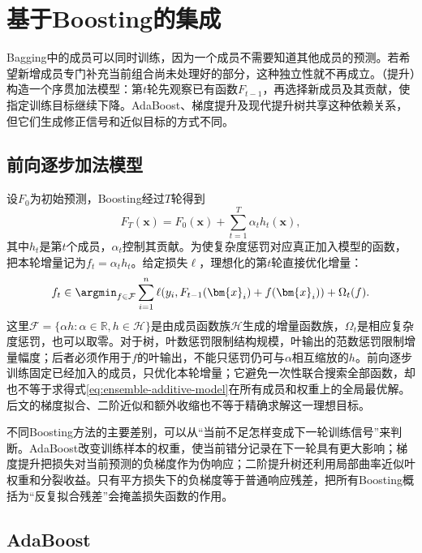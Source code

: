 \section{基于Boosting的集成}
\label{sec:ensemble-boosting}

Bagging中的成员可以同时训练，因为一个成员不需要知道其他成员的预测。若希望新增成员专门补充当前组合尚未处理好的部分，这种独立性就不再成立。（提升）构造一个序贯加法模型：第$t$轮先观察已有函数$F_{t-1}$，再选择新成员及其贡献，使指定训练目标继续下降。AdaBoost、梯度提升及现代提升树共享这种依赖关系，但它们生成修正信号和近似目标的方式不同。

\subsection{前向逐步加法模型}
\label{sec:ensemble-stagewise-additive}

设$F_0$为初始预测，Boosting经过$T$轮得到
\begin{equation}
  F_T(\bm{x})
  =
  F_0(\bm{x})
  +
  \sum_{t=1}^{T}\alpha_t h_t(\bm{x}),
  \label{eq:ensemble-additive-model}
\end{equation}
其中$h_t$是第$t$个成员，$\alpha_t$控制其贡献。为使复杂度惩罚对应真正加入模型的函数，把本轮增量记为$f_t=\alpha_t h_t$。给定损失$\ell$，理想化的第$t$轮直接优化增量：
\begin{equation}
  f_t
  \in
  \argmin_{f\in\mathcal{F}}
  \sum_{i=1}^{n}
  \ell\!\left(
    y_i,
    F_{t-1}(\bm{x}_i)+f(\bm{x}_i)
  \right)
  +\Omega_t(f).
  \label{eq:ensemble-forward-stagewise}
\end{equation}
这里$\mathcal{F}=\{\alpha h:\alpha\in\mathbb{R},h\in\mathcal{H}\}$是由成员函数族$\mathcal{H}$生成的增量函数族，$\Omega_t$是相应复杂度惩罚，也可以取零。对于树，叶数惩罚限制结构规模，叶输出的范数惩罚限制增量幅度；后者必须作用于$f$的叶输出，不能只惩罚仍可与$\alpha$相互缩放的$h$。前向逐步训练固定已经加入的成员，只优化本轮增量；它避免一次性联合搜索全部函数，却也不等于求得式\eqref{eq:ensemble-additive-model}在所有成员和权重上的全局最优解。后文的梯度拟合、二阶近似和额外收缩也不等于精确求解这一理想目标。

不同Boosting方法的主要差别，可以从“当前不足怎样变成下一轮训练信号”来判断。AdaBoost改变训练样本的权重，使当前错分记录在下一轮具有更大影响；梯度提升把损失对当前预测的负梯度作为伪响应；二阶提升树还利用局部曲率近似叶权重和分裂收益。只有平方损失下的负梯度等于普通响应残差，把所有Boosting概括为“反复拟合残差”会掩盖损失函数的作用。

\subsection{AdaBoost}
\label{sec:ensemble-adaboost}

